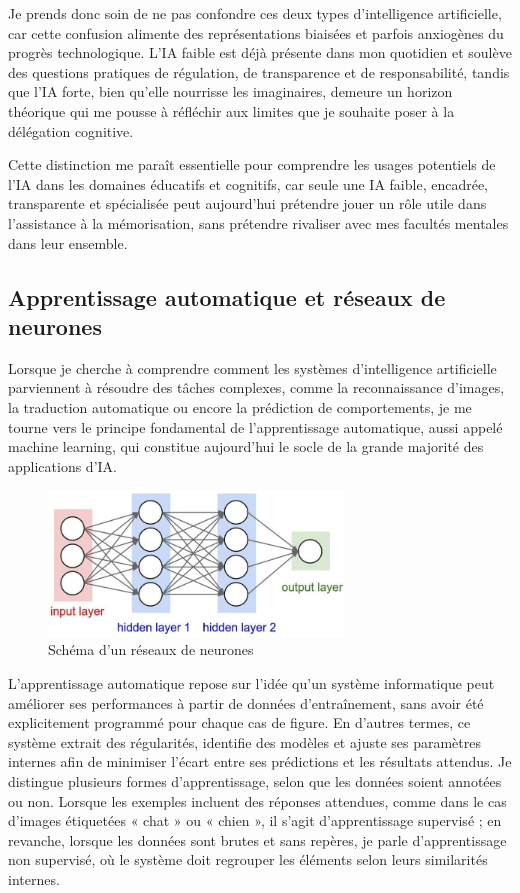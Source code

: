 \documentclass[11pt,a4paper]{report}
\begin{document}
Je prends donc soin de ne pas confondre ces deux types d’intelligence artificielle, car cette confusion alimente des représentations biaisées et parfois anxiogènes du progrès technologique. L’IA faible est déjà présente dans mon quotidien et soulève des questions pratiques de régulation, de transparence et de responsabilité, tandis que l’IA forte, bien qu’elle nourrisse les imaginaires, demeure un horizon théorique qui me pousse à réfléchir aux limites que je souhaite poser à la délégation cognitive.

Cette distinction me paraît essentielle pour comprendre les usages potentiels de l’IA dans les domaines éducatifs et cognitifs, car seule une IA faible, encadrée, transparente et spécialisée peut aujourd’hui prétendre jouer un rôle utile dans l’assistance à la mémorisation, sans prétendre rivaliser avec mes facultés mentales dans leur ensemble.

\subsection{Apprentissage automatique et réseaux de neurones}

Lorsque je cherche à comprendre comment les systèmes d’intelligence artificielle parviennent à résoudre des tâches complexes, comme la reconnaissance d’images, la traduction automatique ou encore la prédiction de comportements, je me tourne vers le principe fondamental de l’apprentissage automatique, aussi appelé machine learning, qui constitue aujourd’hui le socle de la grande majorité des applications d’IA.

\begin{figure}[h]
    \centering
    \includegraphics[width=0.7\textwidth]{images/2.1.3.png}
    \caption{Schéma d'un réseaux de neurones}
    \label{fig:2.1.3}
\end{figure}

L’apprentissage automatique repose sur l’idée qu’un système informatique peut améliorer ses performances à partir de données d’entraînement, sans avoir été explicitement programmé pour chaque cas de figure. En d’autres termes, ce système extrait des régularités, identifie des modèles et ajuste ses paramètres internes afin de minimiser l’écart entre ses prédictions et les résultats attendus. Je distingue plusieurs formes d’apprentissage, selon que les données soient annotées ou non. Lorsque les exemples incluent des réponses attendues, comme dans le cas d’images étiquetées « chat » ou « chien », il s’agit d’apprentissage supervisé ; en revanche, lorsque les données sont brutes et sans repères, je parle d’apprentissage non supervisé, où le système doit regrouper les éléments selon leurs similarités internes.
\end{document}
